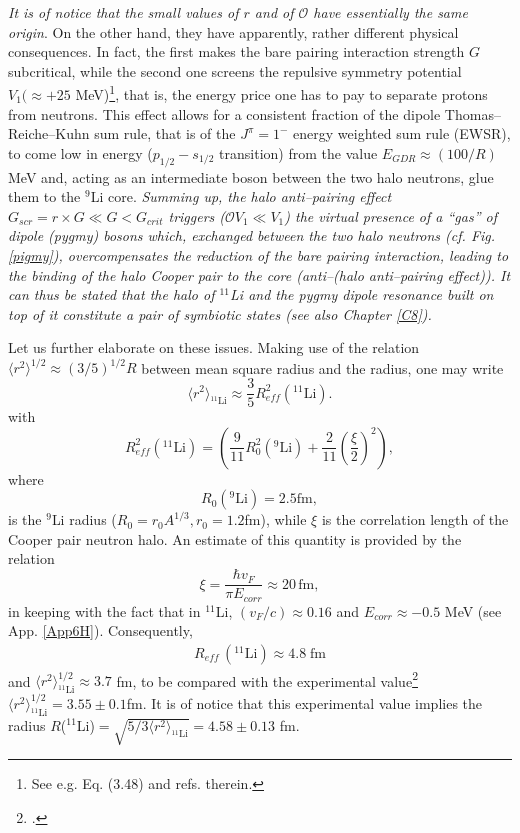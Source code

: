 \textit{It is of notice that the small values of $r$ and of $\mathcal{O}$ have essentially the same origin}. On the other hand, they have apparently, rather different physical consequences. In fact, the first makes the bare pairing interaction strength $G$ subcritical, while the second one screens the repulsive symmetry potential $V_1(\approx +25 $ MeV)\footnote{See e.g. \cite{Bortignon:98} Eq. (3.48) and refs. therein.}, that is, the energy price one has to pay to separate protons from neutrons. This effect allows for a consistent fraction of the dipole Thomas--Reiche--Kuhn sum rule, that is of the $J^{\pi}=1^-$ energy weighted sum rule (EWSR), to come low in energy ($p_{1/2}-s_{1/2}$ transition) from the value $E_{GDR}\approx(100/R)$ MeV and, acting as an intermediate boson between the two halo neutrons, glue them to the $^{9}$Li core. \textit{Summing up, the halo anti--pairing effect $G_{scr}=r\times G\ll G<G_{crit}$ triggers ($\mathcal{O}V_1\ll V_1$) the virtual presence of a ``gas'' of dipole (pygmy) bosons which, exchanged between the two halo neutrons (cf. Fig. \ref{pigmy}), overcompensates the reduction of the bare pairing interaction, leading to the binding of the halo Cooper pair to the core (anti--(halo anti--pairing effect)). It can thus be stated that the halo of $^{11}$Li and the pygmy dipole resonance built on top of it constitute a pair of symbiotic states (see also Chapter \ref{C8}).}

Let us further elaborate on these issues. Making use of the relation $\langle r^2\rangle^{1/2}\approx (3/5)^{1/2}R$ between mean square radius and the radius, one may write
\begin{equation}\label{eq2.6.9}
\langle r^2\rangle_{^{11}\text{Li}}\approx \frac{3}{5}R_{eff}^2(^{11}\text{Li}).
\end{equation}
 with
\begin{equation}\label{eq2.6.10}
R_{eff}^2(^{11}\text{Li})=\left(\frac{9}{11}R_0^2(^9\text{Li})+\frac{2}{11}\left(\frac{\xi}{2}\right)^2\right),
\end{equation}
where
\begin{equation}
R_0(^9\text{Li})=2.5 \text{fm},
\end{equation}
is the $^9$Li radius ($R_0=r_0A^{1/3}, r_0=1.2$fm), while $\xi$ is the correlation length of the Cooper pair neutron halo. An estimate of this quantity is provided by the relation
 \begin{equation}
\xi=\frac{\hbar v_F}{\pi E_{corr}}\approx 20 \, \text{fm},
 \end{equation}
in keeping with the fact that in $^{11}$Li, $(v_F/c)\approx 0.16$ and $E_{corr}\approx-0.5$ MeV (see App. \ref{App6H}). Consequently, 
\begin{align}\label{eq2.F.5}
R_{eff}\,(^{11}\text{Li})\approx 4.8 \;\text{fm}
\end{align} 
and  $\langle r^2\rangle_{^{11}\text{Li}}^{1/2}\approx 3.7$ fm, to be compared with the experimental value\footnote{\cite{Kobayashi:89}.} $\langle r^2\rangle_{^{11}\text{Li}}^{1/2}= 3.55\pm0.1$fm. It is of notice that this experimental value implies  the radius $R$($^{11}$Li)$=\sqrt{5/3\langle r^2\rangle_{^{11}\text{Li}}}=4.58\pm 0.13$ fm.


